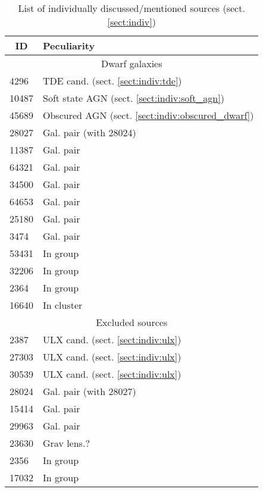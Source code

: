 \documentclass[fleqn,usenatbib]{mnras}
\begin{document}
\begin{table}
\begin{tabular}{ll}
\multicolumn{1}{c|}{ID}    & Peculiarity     \\ \hline
\multicolumn{2}{c}{Dwarf galaxies}          \\
\multicolumn{1}{l|}{4296}  & TDE cand. (sect. \ref{sect:indiv:tde})      \\
\multicolumn{1}{l|}{10487} & Soft state AGN (sect. \ref{sect:indiv:soft_agn}) \\
\multicolumn{1}{l|}{45689} & Obscured AGN (sect. \ref{sect:indiv:obscured_dwarf})  \\
\multicolumn{1}{l|}{28027} & Gal. pair (with 28024)      \\ 
\multicolumn{1}{l|}{11387} & Gal. pair     \\ 
\multicolumn{1}{l|}{64321} & Gal. pair     \\ 
\multicolumn{1}{l|}{34500} & Gal. pair     \\ 
\multicolumn{1}{l|}{64653} & Gal. pair     \\ 
\multicolumn{1}{l|}{25180} & Gal. pair     \\ 
\multicolumn{1}{l|}{3474} & Gal. pair     \\ 
\multicolumn{1}{l|}{53431} & In group     \\ 
\multicolumn{1}{l|}{32206} & In group     \\ 
\multicolumn{1}{l|}{2364} & In group     \\ 
\multicolumn{1}{l|}{16640} & In cluster     \\ 
\multicolumn{2}{c}{Excluded sources}        \\ \hline
\multicolumn{1}{l|}{2387}  & ULX cand. (sect. \ref{sect:indiv:ulx})     \\
\multicolumn{1}{l|}{27303} & ULX cand.  (sect. \ref{sect:indiv:ulx})    \\
\multicolumn{1}{l|}{30539} & ULX cand.  (sect. \ref{sect:indiv:ulx})    \\ 
\multicolumn{1}{l|}{28024} & Gal. pair (with 28027)      \\ 
\multicolumn{1}{l|}{15414} & Gal. pair     \\ 
\multicolumn{1}{l|}{29963} & Gal. pair     \\             
\multicolumn{1}{l|}{23630} & Grav lens.?     \\ 
\multicolumn{1}{l|}{2356} & In group     \\ 
\multicolumn{1}{l|}{17032} & In group     \\ 
\end{tabular}
\caption[List of individual sources discussed in detail.]{List of individually discussed/mentioned sources (sect. \ref{sect:indiv})}
\label{tab:peculiar}
\end{table}
\end{document}
